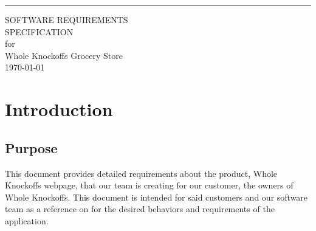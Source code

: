 \documentclass{scrreprt}
\date{}
\theoremstyle{funreq}
\def\myversion{1.0 }
\begin{document}
\begin{flushright}
    \rule{16cm}{5pt}\vskip1cm
    \begin{bfseries}
        \Huge{SOFTWARE REQUIREMENTS\\ SPECIFICATION}\\
        \vspace{1.9cm}
        for\\
        \vspace{1.9cm}
        Whole Knockoffs Grocery Store\\
        \vspace{1.9cm}
        \today\\
    \end{bfseries}
\end{flushright}

\tableofcontents


%

\chapter{Introduction}

\section{Purpose}
This document provides detailed requirements about the product, Whole Knockoffs webpage, that our team is creating for our customer, the owners of Whole Knockoffs.  This document is intended for said customers and our software team as a reference on for the desired behaviors and requirements of the application.
\end{document}
